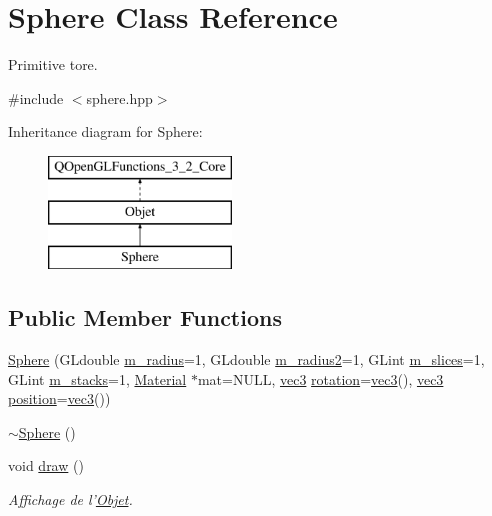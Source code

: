 \hypertarget{class_sphere}{\section{Sphere Class Reference}
\label{class_sphere}
}


Primitive tore.  




{\ttfamily \#include $<$sphere.\+hpp$>$}

Inheritance diagram for Sphere\+:\begin{figure}[H]
\begin{center}
\leavevmode
\includegraphics[height=3.000000cm]{class_sphere}
\end{center}
\end{figure}
\subsection*{Public Member Functions}
\begin{DoxyCompactItemize}
\item 
\hyperlink{class_sphere_ae6811ba8643126e4f3a7443d752c49b0}{Sphere} (G\+Ldouble \hyperlink{class_sphere_a4b019bb4bf74ac28ab56d5ae2c9ca6ea}{m\+\_\+radius}=1, G\+Ldouble \hyperlink{class_sphere_aa3ec1c07df539131c0fb886fe9c619fd}{m\+\_\+radius2}=1, G\+Lint \hyperlink{class_sphere_a6ddad99936fa616fa04862aa92e20105}{m\+\_\+slices}=1, G\+Lint \hyperlink{class_sphere_aef79b7beb9d008e8dcc0849fbe691072}{m\+\_\+stacks}=1, \hyperlink{class_material}{Material} $\ast$mat=N\+U\+L\+L, \hyperlink{structvec3}{vec3} \hyperlink{class_objet_ac69a1b459bcb4433099c8cfbff06b209}{rotation}=\hyperlink{structvec3}{vec3}(), \hyperlink{structvec3}{vec3} \hyperlink{class_objet_a0e109bc790b14328202dd2546b04e2fd}{position}=\hyperlink{structvec3}{vec3}())
\item 
\hyperlink{class_sphere_a569c071e50a3e11f678630ee1a17737e}{$\sim$\+Sphere} ()
\item 
void \hyperlink{class_sphere_a34a34167b7544c95155d3ff30638d045}{draw} ()
\begin{DoxyCompactList}\small\item\em Affichage de l'\hyperlink{class_objet}{Objet}. \end{DoxyCompactList}\end{DoxyCompactItemize}
